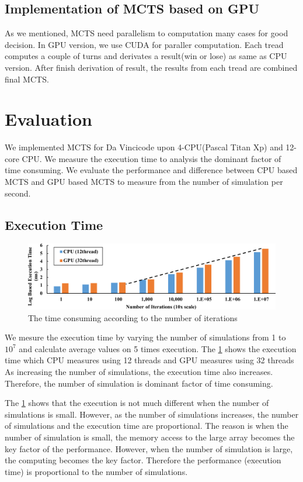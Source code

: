 \documentclass[conference]{IEEEtran}
\begin{document}
\subsection{Implementation of MCTS based on GPU}
As we mentioned, MCTS need parallelism to computation many cases for good decision. 
In GPU version, we use CUDA for paraller computation. 
Each tread computes a couple of turns and derivates a result(win or lose) as same as CPU version. 
After finish derivation of result, the results from each tread are combined final MCTS. 


\section{Evaluation}
We implemented MCTS for Da Vincicode upon 4-CPU(Pascal Titan Xp) and 12-core CPU.
We measure the execution time to analysis the dominant factor of time consuming.
We evaluate the performance and difference between CPU based MCTS and GPU based MCTS to measure from the number of simulation per second.

\subsection{Execution Time}
\begin{figure}
\includegraphics[width=2.05\columnwidth]{figures/time_consuming.pdf}
\caption{The time consuming according to the number of iterations}
\label{fig:time_consuming}
\end{figure}

We mesure the execution time by varying the number of simulations from 1 to $10^7$ and calculate average values on 5 times execution. 
The \cref{fig:time_consuming} shows the execution time which CPU measures using 12 threads and GPU measures using 32 threads
As increasing the number of simulations, the execution time also increases. Therefore, the number of simulation is dominant factor of time consuming. 

The \cref{fig:time_consuming} shows that the execution is not much different when the number of simulations is small. 
However, as the number of simulations increases, the number of simulations and the execution time are proportional.
The reason is when the number of simulation is small, the memory access to the large array becomes the key factor of the performance. However, when the number of simulation is large, the computing becomes the key factor. Therefore the performance (execution time) is proportional to the number of simulations.
\end{document}
